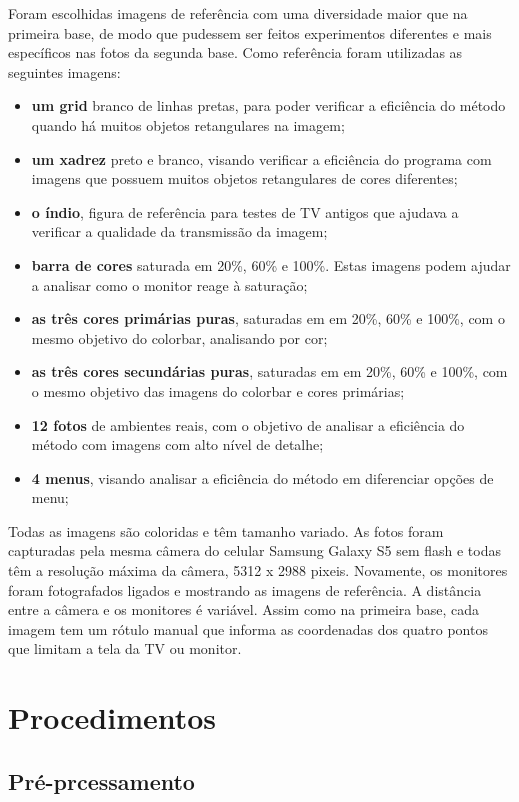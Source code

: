 Foram escolhidas imagens de referência com uma diversidade maior que na primeira base, de modo que pudessem ser feitos experimentos diferentes e mais específicos nas fotos da segunda base. Como referência foram utilizadas as seguintes imagens:
\begin{itemize}
\item \textbf{um grid} branco de linhas pretas, para poder verificar a eficiência do método quando há muitos objetos retangulares na imagem;
\item \textbf{um xadrez} preto e branco, visando verificar a eficiência do programa com imagens que possuem muitos objetos retangulares de cores diferentes;
\item \textbf{o índio}, figura de referência para testes de TV antigos que ajudava a verificar a qualidade da transmissão da imagem;
\item \textbf{barra de cores} saturada em 20\%, 60\% e 100\%. Estas imagens podem ajudar a analisar como o monitor reage à saturação;
\item \textbf{as três cores primárias puras}, saturadas em em 20\%, 60\% e 100\%, com o mesmo objetivo do colorbar, analisando por cor;
\item \textbf{as três cores secundárias puras}, saturadas em em 20\%, 60\% e 100\%, com o mesmo objetivo das imagens do colorbar e cores primárias;
\item \textbf{12 fotos} de ambientes reais, com o objetivo de analisar a eficiência do método com imagens com alto nível de detalhe;
\item \textbf{4 menus}, visando analisar a eficiência do método em diferenciar opções de menu;
\end{itemize}

Todas as imagens são coloridas e têm tamanho variado. As fotos foram capturadas pela mesma câmera do celular Samsung Galaxy S5 sem flash e todas têm a resolução máxima da câmera, 5312 x 2988 pixeis. Novamente, os monitores foram fotografados ligados e mostrando as imagens de referência. A distância entre a câmera e os monitores é variável. Assim como na primeira base, cada imagem tem um rótulo manual que informa as coordenadas dos quatro pontos que limitam a tela da TV ou monitor.

\section{Procedimentos}

\subsection{Pré-prcessamento}



